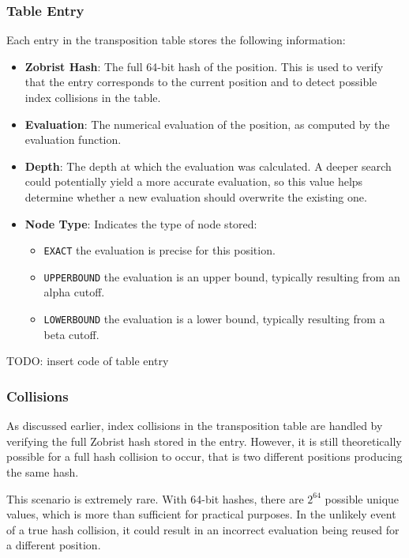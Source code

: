 \subsubsection{Table Entry}

Each entry in the transposition table stores the following information:

\begin{itemize}
  \item \textbf{Zobrist Hash}: The full 64-bit hash of the position. This is used to verify that the entry corresponds to the current position and to detect possible index collisions in the table.
  \item \textbf{Evaluation}: The numerical evaluation of the position, as computed by the evaluation function.
  \item \textbf{Depth}: The depth at which the evaluation was calculated. A deeper search could potentially yield a more accurate evaluation, so this value helps determine whether a new evaluation should overwrite the existing one.
  \item \textbf{Node Type}: Indicates the type of node stored:
  \begin{itemize}
    \item \texttt{EXACT} the evaluation is precise for this position.
    \item \texttt{UPPERBOUND} the evaluation is an upper bound, typically resulting from an alpha cutoff.
    \item \texttt{LOWERBOUND} the evaluation is a lower bound, typically resulting from a beta cutoff.
  \end{itemize}
\end{itemize}

TODO: insert code of table entry

\subsubsection{Collisions}

As discussed earlier, index collisions in the transposition table are handled by verifying the full Zobrist hash stored in the entry. However, it is still theoretically possible for a full hash collision to occur, that is two different positions producing the same hash.

\vspace{1em}

\noindent This scenario is extremely rare. With 64-bit hashes, there are $2^{64}$ possible unique values, which is more than sufficient for practical purposes. In the unlikely event of a true hash collision, it could result in an incorrect evaluation being reused for a different position.

